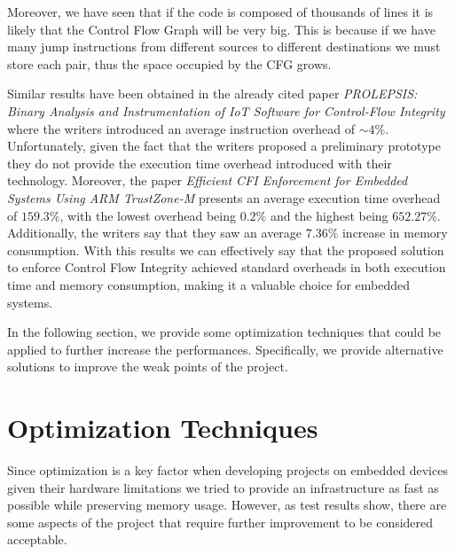 Moreover, we have seen that if the code is composed of thousands of lines it is
likely that the Control Flow Graph will be very big. This is because if we have many
jump instructions from different sources to different destinations we must store
each pair, thus the space occupied by the CFG grows.

Similar results have been obtained in the already cited paper \textit{PROLEPSIS:
Binary Analysis and Instrumentation of IoT Software for Control-Flow Integrity}\cite{article2}
where the writers introduced an average instruction overhead of $\sim 4\%$. Unfortunately,
given the fact that the writers proposed a preliminary prototype they do not
provide the execution time overhead introduced with their technology. Moreover,
the paper \textit{Efficient CFI Enforcement for Embedded Systems Using ARM
TrustZone-M}\cite{article1} presents an average execution time overhead of
$159.3 \%$, with the lowest overhead being $0.2 \%$ and the highest being $652.27
\%$. Additionally, the writers say that they saw an average $7.36\%$ increase in
memory consumption. With this results we can effectively say that the proposed
solution to enforce Control Flow Integrity achieved standard overheads in both
execution time and memory consumption, making it a valuable choice for embedded systems.

In the following section, we provide some optimization techniques that could be
applied to further increase the performances. Specifically, we provide
alternative solutions to improve the weak points of the project.

\section{Optimization Techniques}
\label{sec:pa_optimization}

Since optimization is a key factor when developing projects on embedded devices given
their hardware limitations we tried to provide an infrastructure as fast as possible
while preserving memory usage. However, as test results show, there are some
aspects of the project that require further improvement to be considered
acceptable.

